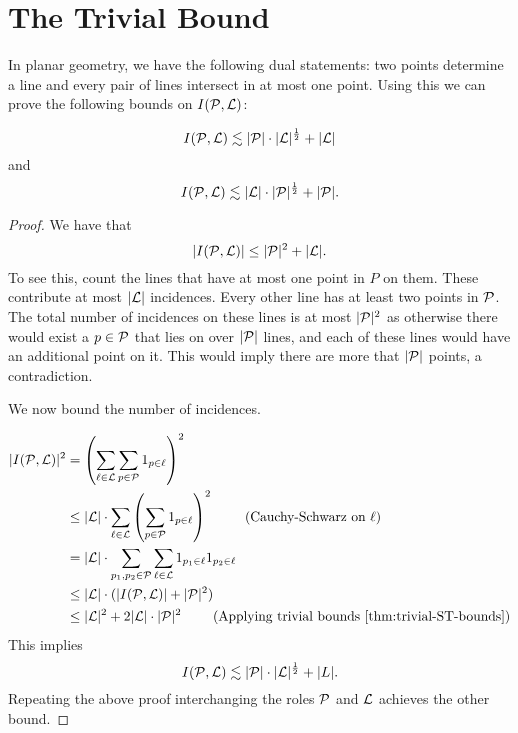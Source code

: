 \section{The Trivial Bound}
In planar geometry, we have the following dual statements: two points determine a line and every pair of lines intersect in at most one point.
Using this we can prove the following bounds on $I(\mathcal P,\mathcal L)$:
\begin{theorem}
    $$I(\mathcal P,\mathcal L) \lesssim |\mathcal P|\cdot |\mathcal L|^{\frac{1}{2}} + |\mathcal L|$$
    and
    $$I(\mathcal P,\mathcal L) \lesssim |\mathcal L|\cdot |\mathcal P|^{\frac{1}{2}} + |\mathcal P|.$$
    \label{thm:trivial-ST-bounds}
\end{theorem}
\begin{proof}
    

We have that 
$$|I(\mathcal P,\mathcal L)| \leq |\mathcal P|^2 + |\mathcal L|.$$
To see this, count the lines that have at most one point in $P$ on them. These contribute at most $|\mathcal L|$ incidences.
Every other line has at least two points in $\mathcal P$. The total number of incidences on these lines is at most $|\mathcal P|^2$
as otherwise there would exist a $p\in \mathcal P$ that lies on over $|\mathcal P|$ lines, and each of these lines would have an additional 
point on it. This would imply there are more that $|\mathcal P|$ points, a contradiction. 

We now bound the number of incidences. 

\begin{align*}
    |I(\mathcal P,\mathcal L)|^2 &= \left( \sum_{\ell \in \mathcal L} \sum_{p \in \mathcal P} 1_{p\in \ell} \right)^2 \\
    & \leq |\mathcal L|\cdot \sum_{\ell \in \mathcal L} \left( \sum_{p \in \mathcal P} 1_{p\in \ell} \right)^2  \qquad \text{ (Cauchy-Schwarz on $\ell$)}\\
    &= |\mathcal L|\cdot \sum_{p_1,p_2 \in \mathcal P} \sum_{\ell \in \mathcal L}   1_{p_1\in \ell} 1_{p_2\in \ell}    \\
    & \leq |\mathcal L|\cdot ( |I(\mathcal P,\mathcal L)| + |\mathcal P|^2)\\
    &\leq |\mathcal L|^2 + 2|\mathcal L|\cdot |\mathcal P|^2 \qquad \text{ (Applying trivial bounds \ref{thm:trivial-ST-bounds})}\\ 
\end{align*}    
This implies
$$I(\mathcal P,\mathcal L) \lesssim |\mathcal P|\cdot |\mathcal L|^{\frac{1}{2}} + |L|.$$ 
Repeating the above proof interchanging the roles $\mathcal P$ and $\mathcal L$ achieves the other bound.
\end{proof}



